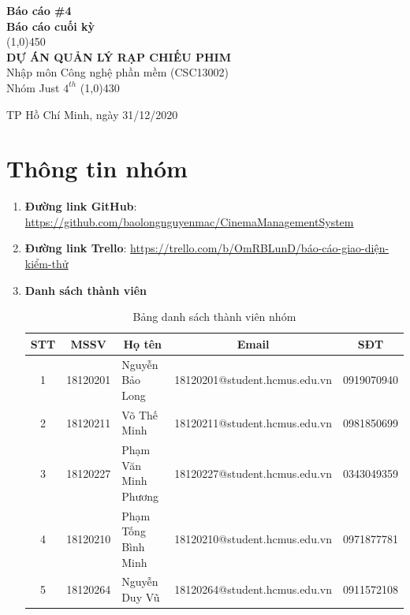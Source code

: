 \documentclass[a4paper, 12pt]{article}
\begin{document}
\begin{titlepage}
	\begin{center}
		\vspace*{1cm}
		\Large\textbf{Báo cáo \#4\\Báo cáo cuối kỳ}\\

		\vfill
		\line(1,0){450}\\[4mm]
		\LARGE\textbf{\MakeUppercase{Dự án quản lý rạp chiếu phim}}\\[3mm]
		\Large{Nhập môn Công nghệ phần mềm (CSC13002)}\\[3mm]
		\Large{Nhóm Just $4^{th}$}
		\line(1,0){430}\\
		\vfill

		\vfill
		TP Hồ Chí Minh, ngày 31/12/2020
	\end{center}
\end{titlepage}

\tableofcontents
\thispagestyle{empty}
\clearpage

\section{Thông tin nhóm}
\label{sec:info}
\begin{enumerate}
	\item \textbf{Đường link GitHub}: \url{https://github.com/baolongnguyenmac/CinemaManagementSystem}
	\item \textbf{Đường link Trello}: \url{https://trello.com/b/OmRBLunD/báo-cáo-giao-diện-kiểm-thử}
	\item \textbf{Danh sách thành viên}
	\begin{table}[H]
		\begin{center}
			\begin{tabular}{|c|c|l|c|c|}
				\hline
				STT & MSSV     & \multicolumn{1}{c|}{Họ tên} & Email                         & SĐT        \\ \hline
				1   & 18120201 & Nguyễn Bảo Long             & 18120201@student.hcmus.edu.vn & 0919070940 \\ \hline
				2   & 18120211 & Võ Thế Minh                 & 18120211@student.hcmus.edu.vn & 0981850699 \\ \hline
				3   & 18120227 & Phạm Văn Minh Phương        & 18120227@student.hcmus.edu.vn & 0343049359 \\ \hline
				4   & 18120210 & Phạm Tống Bình Minh         & 18120210@student.hcmus.edu.vn & 0971877781 \\ \hline
				5   & 18120264 & Nguyễn Duy Vũ               & 18120264@student.hcmus.edu.vn & 0911572108 \\ \hline
			\end{tabular}
			\caption{Bảng danh sách thành viên nhóm}
		\end{center}
	\end{table}
\end{enumerate}
\clearpage
\end{document}
